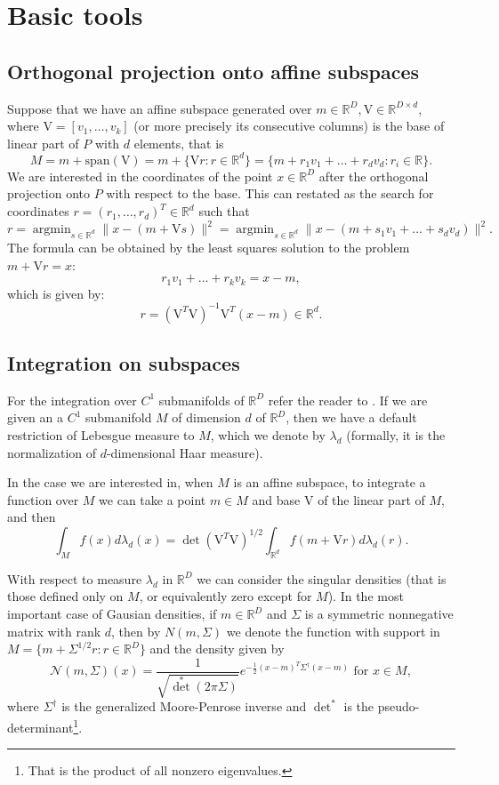 \documentclass[12pt]{article}
\def\R{\mathbb{R}}
\def\v{\mathrm{V}}
\def\span{\mathrm{span}}
\def\nor{\mathcal{N}}
\theoremstyle{definition}
\DeclareMathOperator*{\argmin}{argmin}
\begin{document}

\section{Basic tools}


\subsection{Orthogonal projection onto affine subspaces}

Suppose that we have an affine subspace generated over $m \in \R^D,\v \in \R^{D \times d}$, where 
$\v=[v_1,\ldots,v_k]$ (or more precisely its consecutive columns) is the base of linear part of $P$ with $d$ elements, that is
$$
M=m+\span (\v)=m+\{\v r:r \in \R^d\}=\{m+r_1v_1+\ldots+r_dv_d: r_i \in \R\}.
$$
We are interested in the coordinates of the point $x \in \R^D$ after the orthogonal
projection onto $P$ with respect to the base.
This can restated as the search for coordinates $r=(r_1,\ldots,r_d)^T \in \R^d$
such that
$$
r=\argmin_{s \in \R^d} \|x-(m+\v s)\|^2=\argmin_{s \in \R^d} \|x-(m+s_1v_1+\ldots+s_dv_d)\|^2.
$$
The formula can be obtained by the least squares solution to the problem $m+\v r=x$:
$$
r_1v_1+\ldots+r_kv_k=x-m,
$$
which is given by:
$$
r=(\v^T\v)^{-1}\v^T(x-m) \in \R^d.
$$


\subsection{Integration on subspaces}

For the integration over $C^1$ submanifolds of $\R^D$ refer the reader to  \cite{munkres1997analysis, federer2014geometric}. If we are given an a $C^1$ submanifold $M$  of dimension $d$ of $\R^D$, then we have a default restriction of Lebesgue measure to $M$, which we denote by $\lambda_d$ (formally, it is the normalization of $d$-dimensional Haar measure).

In the case we are interested in, when $M$ is an affine subspace, to integrate
a function over $M$ we can take a point $m \in M$ and base $\v$ of the linear part
of $M$, and then
$$
\int_M f(x) d\lambda_d(x)=\det(\v^T\v)^{1/2} \int_{\R^d} f(m+\v r) d\lambda_d(r).
$$

With respect to measure $\lambda_d$ in $\R^D$ we can consider the 
singular densities (that is those defined only on $M$, or equivalently zero 
except for $M$). In the most important case of Gausian densities, if $m \in \R^D$ and $\Sigma$ is a symmetric nonnegative 
matrix with rank $d$, then by $N(m,\Sigma)$ we denote the function with support
in $M=\{m+\Sigma^{1/2}r : r\in \R^D\}$ and the density given by
$$
\nor(m,\Sigma)(x)=\frac{1}{\sqrt{\det^{*}(2\pi \Sigma )}} e^{-\frac{1}{2}(x -m)^T{\Sigma }^\dagger (x -m)} \text{ for } x \in M,
$$
where $\Sigma^\dagger$ is the generalized Moore-Penrose inverse and $\det^*$ is the pseudo-determinant\footnote{That is the product of all nonzero eigenvalues.}.
\end{document}
